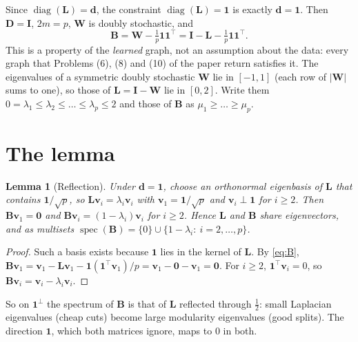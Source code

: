 \documentclass[11pt,a4paper]{article}
\newcommand{\Lap}{\mathbf{L}}
\newcommand{\Wmat}{\mathbf{W}}
\newcommand{\Bmat}{\mathbf{B}}
\newcommand{\Dmat}{\mathbf{D}}
\newcommand{\Imat}{\mathbf{I}}
\newcommand{\dvec}{\mathbf{d}}
\newcommand{\vvec}{\mathbf{v}}
\newcommand{\one}{\mathbf{1}}
\newtheorem{lemma}{Lemma}
\theoremstyle{remark}
\begin{document}
Since $\operatorname{diag}(\Lap)=\dvec$, the constraint $\operatorname{diag}(\Lap)=\one$ is
exactly $\dvec=\one$. Then $\Dmat=\Imat$, $2m=p$, $\Wmat$ is doubly stochastic, and
\begin{equation}\label{eq:B}
  \Bmat=\Wmat-\tfrac1p\one\one^\top=\Imat-\Lap-\tfrac1p\one\one^\top .
\end{equation}
This is a property of the \emph{learned} graph, not an assumption about the data: every
graph that Problems (6), (8) and (10) of the paper return satisfies it. The eigenvalues
of a symmetric doubly stochastic $\Wmat$ lie in $[-1,1]$ (each row of $|\Wmat|$ sums to
one), so those of $\Lap=\Imat-\Wmat$ lie in $[0,2]$. Write them
$0=\lambda_1\le\lambda_2\le\dots\le\lambda_p\le2$ and those of $\Bmat$ as
$\mu_1\ge\dots\ge\mu_p$.

\section{The lemma}\label{sec:lemma}

\begin{lemma}[Reflection]\label{lem:core}
Under $\dvec=\one$, choose an orthonormal eigenbasis of $\Lap$ that contains
$\one/\sqrt p$, so $\Lap\vvec_i=\lambda_i\vvec_i$ with $\vvec_1=\one/\sqrt p$ and
$\vvec_i\perp\one$ for $i\ge2$. Then $\Bmat\vvec_1=\mathbf 0$ and
$\Bmat\vvec_i=(1-\lambda_i)\vvec_i$ for $i\ge2$. Hence $\Lap$ and $\Bmat$ share
eigenvectors, and as multisets
$\operatorname{spec}(\Bmat)=\{0\}\cup\{1-\lambda_i:\ i=2,\dots,p\}$.
\end{lemma}
\begin{proof}
Such a basis exists because $\one$ lies in the kernel of $\Lap$. By \eqref{eq:B},
$\Bmat\vvec_1=\vvec_1-\Lap\vvec_1-\one(\one^\top\vvec_1)/p
=\vvec_1-\mathbf 0-\vvec_1=\mathbf 0$. For $i\ge2$, $\one^\top\vvec_i=0$, so
$\Bmat\vvec_i=\vvec_i-\lambda_i\vvec_i$.
\end{proof}

So on $\one^\perp$ the spectrum of $\Bmat$ is that of $\Lap$ reflected through
$\tfrac12$: small Laplacian eigenvalues (cheap cuts) become large modularity
eigenvalues (good splits). The direction $\one$, which both matrices ignore, maps to
0 in both.
\end{document}
